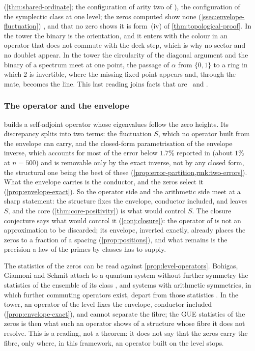 (\cref{thm:shared-ordinate}; the configuration of arity two of \cite{gonzalez26cw}), the configuration of the symplectic
class at one level; the zeros computed show none (\cref{ssec:envelope-fluctuation}) , and that no zero shows it is form~(iv) of \cref{thm:topological-proof}.  In the tower the binary is the orientation, and it
enters with the colour in an operator that does not commute with the deck step, which is why no sector and no doublet
appear.  In the tower the circularity of the diagonal argument and the binary of a spectrum meet at one point, the passage of $\alpha$ from $\{0,1\}$ to
a ring in which $2$ is invertible, where the missing fixed point appears and, through the mate, becomes the line.  This last reading joins facts that are \ and .

\subsubsection{The operator and the envelope}\label{ssec:disc-hp-operator}

\cite{gonzalez25hp} builds a self-adjoint operator whose eigenvalues follow the
zero heights.  Its discrepancy splits into two terms: the fluctuation $S$, which no
operator built from the envelope can carry, and the closed-form parametrisation of
the envelope inverse, which accounts for most of the error below $1.7\%$ reported in
\cite{gonzalez25hp} (about $1\%$ at $n=500$) and is removable only by the exact inverse,
not by any closed form, the structural one being the best of these
(\cref{prop:error-partition,rmk:two-errors}).  What the envelope carries is the conductor, and the zeros select it
(\cref{prop:envelope-exact}).  So the operator side and the arithmetic side meet at
a sharp statement: the structure fixes the envelope, conductor included, and leaves
$S$, and the core (\cref{thm:core-positivity}) is what would control $S$.  The closure conjecture says what would control it (\cref{conj:closure}): the operator of \cite{gonzalez25hp} is not an approximation to
be discarded; its envelope, inverted exactly, already places the zeros to a fraction of a spacing
(\cref{prop:positions}), and what remains is the precision a law of the primes by classes has to
supply.

The statistics of the zeros can be read against \cref{prop:level-operators}.  Bohigas, Giannoni and Schmit
attach to a quantum system without further symmetry the statistics of the ensemble of its class \cite{bgs84}, and
systems with arithmetic symmetries, in which further commuting operators exist, depart from those statistics
\cite{bggs92,keating91}.  In the tower, an operator of the level fixes the envelope, conductor included
(\cref{prop:envelope-exact}), and cannot separate the fibre; the GUE statistics of the zeros is then what such an
operator shows of a structure whose fibre it does not resolve.  This is a reading, not a theorem: it does
not say that the zeros carry the fibre, only where, in this framework, an operator built on the level stops.

